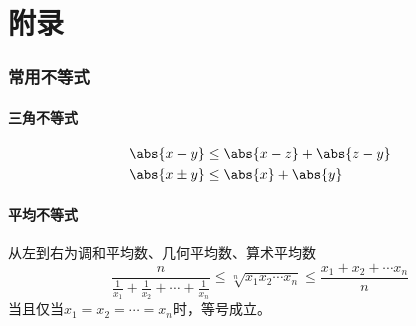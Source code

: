 \pagestyle{fancynotes}
\part{附录}

\section{常用不等式}
\subsection{三角不等式}
\begin{align}
    \label{eq:三角不等式}
    \abs{x-y}     & \leq \abs{x-z} + \abs{z-y} \\
    \abs{x \pm y} & \leq \abs{x} + \abs{y}
\end{align}


\subsection{平均不等式}
从左到右为调和平均数、几何平均数、算术平均数
\begin{equation}
    \label{eq:平均不等式}
    \frac{n}{\frac{1}{x_1} + \frac{1}{x_2} + \cdots + \frac{1}{x_n}}
    \leq \sqrt[n]{x_1x_2 \cdots x_n}
    \leq \frac{x_1 + x_2 + \cdots x_n}{n}
\end{equation}
当且仅当$ x_1 = x_2 = \cdots = x_n $时，等号成立。

